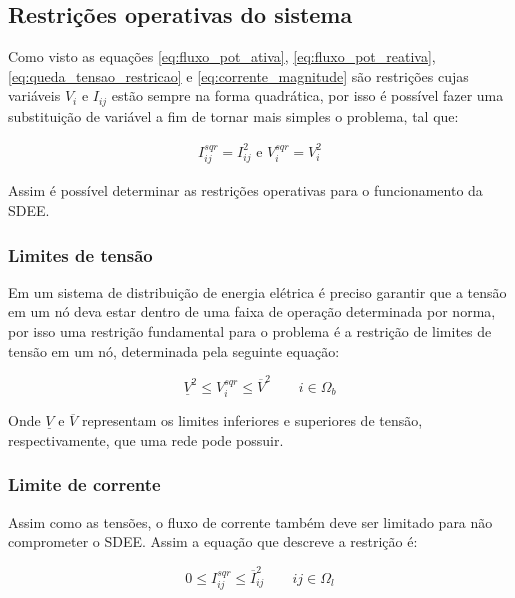 \subsection{Restrições operativas do sistema}

Como visto as equações \ref{eq:fluxo_pot_ativa}, \ref{eq:fluxo_pot_reativa}, \ref{eq:queda_tensao_restricao} e \ref{eq:corrente_magnitude}
são restrições cujas variáveis $V_{i}$ e $I_{ij}$ estão sempre na forma quadrática, por isso é possível fazer uma substituição de variável a fim de tornar mais simples o problema, tal que:

\begin{align*}
    I_{ij}^{sqr} = I_{ij}^{2} \text{ e } V_{i}^{sqr} = V_{i}^{2} 
\end{align*}

Assim é possível determinar as restrições operativas para o funcionamento da SDEE.


\subsubsection{Limites de tensão}

Em um sistema de distribuição de energia elétrica é preciso garantir que a tensão em um nó deva estar dentro de uma faixa de operação determinada por norma, por isso uma restrição fundamental para o problema é a restrição de limites de tensão em um nó, determinada pela seguinte equação:

\begin{equation}
    \underline{V}^{2} \leq V_{i}^{sqr} \leq \overline{V}^{2}\qquad i \in\Omega_{b}
\end{equation}

Onde $\underline{V}$ e $\overline{V}$ representam os limites inferiores e superiores de tensão, respectivamente, que uma rede pode possuir.

\subsubsection{Limite de corrente}

Assim como as tensões, o fluxo de corrente também deve ser limitado para não comprometer o SDEE.
Assim a equação que descreve a restrição é:

\begin{equation}
    0 \leq I_{ij}^{sqr} \leq \overline{I}_{ij}^{2} \qquad ij\in\Omega_{l} 
\end{equation}

